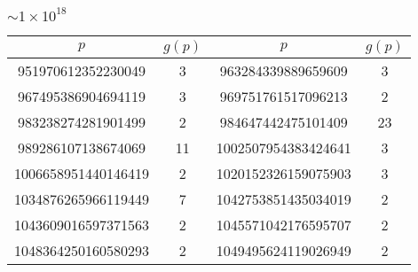 \subsubsection{$\sim 1 \times 10^{18}$}

  \begin{tabular}{|c|c|c|c|}
  \hline
  $p$ & $g(p)$ & $p$ & $g(p)$ \\ \hline
951970612352230049 & 3 & 963284339889659609 & 3 \\
967495386904694119 & 3 & 969751761517096213 & 2 \\
983238274281901499 & 2 & 984647442475101409 & 23 \\
989286107138674069 & 11 & 1002507954383424641 & 3 \\
1006658951440146419 & 2 & 1020152326159075903 & 3 \\
1034876265966119449 & 7 & 1042753851435034019 & 2 \\
1043609016597371563 & 2 & 1045571042176595707 & 2 \\
1048364250160580293 & 2 & 1049495624119026949 & 2 \\
  \hline
  \end{tabular}





